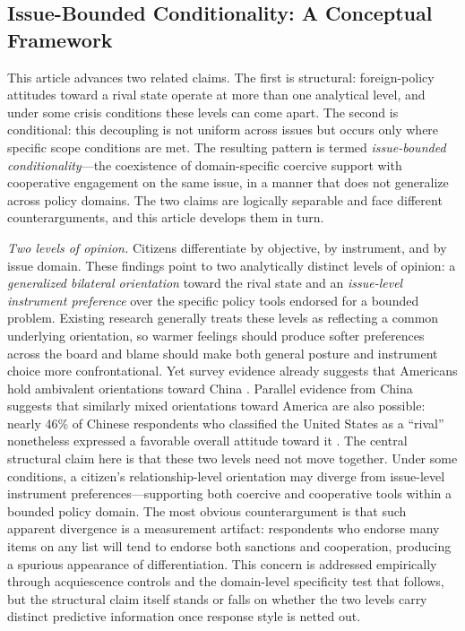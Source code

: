 \documentclass[12pt,letterpaper]{article}
\begin{document}
\subsection{Issue-Bounded Conditionality: A Conceptual Framework}
\label{sec:theory_ibc}

This article advances two related claims. The first is structural: foreign-policy attitudes toward a rival state operate at more than one analytical level, and under some crisis conditions these levels can come apart. The second is conditional: this decoupling is not uniform across issues but occurs only where specific scope conditions are met. The resulting pattern is termed \emph{issue-bounded conditionality}---the coexistence of domain-specific coercive support with cooperative engagement on the same issue, in a manner that does not generalize across policy domains. The two claims are logically separable and face different counterarguments, and this article develops them in turn.

\textit{Two levels of opinion.} Citizens differentiate by objective, by instrument, and by issue domain. These findings point to two analytically distinct levels of opinion: a \emph{generalized bilateral orientation} toward the rival state and an \emph{issue-level instrument preference} over the specific policy tools endorsed for a bounded problem. Existing research generally treats these levels as reflecting a common underlying orientation, so warmer feelings should produce softer preferences across the board and blame should make both general posture and instrument choice more confrontational. Yet survey evidence already suggests that Americans hold ambivalent orientations toward China \citep{wick_capabilities_2014, chubb_chinese_2024, hu_calibrating_2025}. Parallel evidence from China suggests that similarly mixed orientations toward America are also possible: nearly 46\% of Chinese respondents who classified the United States as a ``rival'' nonetheless expressed a favorable overall attitude toward it \citep{wick_capabilities_2014, wang_eyes_2022}. The central structural claim here is that these two levels need not move together. Under some conditions, a citizen's relationship-level orientation may diverge from issue-level instrument preferences---supporting both coercive and cooperative tools within a bounded policy domain. The most obvious counterargument is that such apparent divergence is a measurement artifact: respondents who endorse many items on any list will tend to endorse both sanctions and cooperation, producing a spurious appearance of differentiation. This concern is addressed empirically through acquiescence controls and the domain-level specificity test that follows, but the structural claim itself stands or falls on whether the two levels carry distinct predictive information once response style is netted out.
\end{document}
